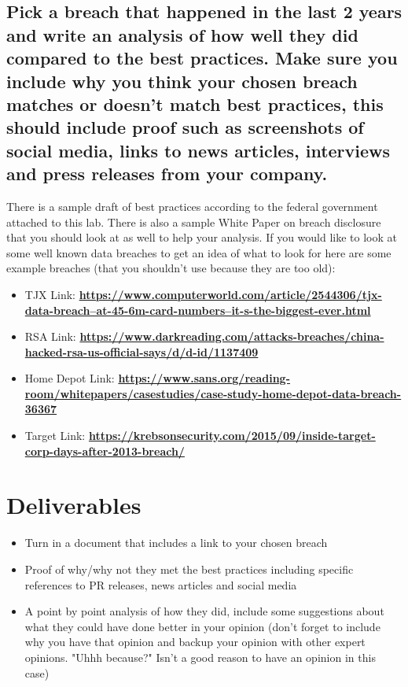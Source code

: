 \documentclass[12pt]{article}
\begin{document}
\subsection*{Pick a breach that happened in the last 2 years and write an analysis of how well they did compared to the best practices. Make sure you include why you think your chosen breach matches or doesn't match best practices, this should include proof such as screenshots of social media, links to news articles, interviews and press releases from your company.}
There is a sample draft of best practices according to the federal government attached to this lab.  There is also a sample White Paper on breach disclosure that you should look at as well to help your analysis.  If you would like to look at some well known data breaches to get an idea of what to look for here are some example breaches (that you shouldn't use because they are too old):
    \begin{itemize}
        \item TJX Link: \href{https://www.computerworld.com/article/2544306/tjx-data-breach--at-45-6m-card-numbers--it-s-the-biggest-ever.html}{\textbf{https://www.computerworld.com/article/2544306/tjx-data-breach--at-45-6m-card-numbers--it-s-the-biggest-ever.html}}
        \item RSA Link: \href{https://www.darkreading.com/attacks-breaches/china-hacked-rsa-us-official-says/d/d-id/1137409}{\textbf{https://www.darkreading.com/attacks-breaches/china-hacked-rsa-us-official-says/d/d-id/1137409}}
        \item Home Depot Link: \href{https://www.sans.org/reading-room/whitepapers/casestudies/case-study-home-depot-data-breach-36367}{\textbf{https://www.sans.org/reading-room/whitepapers/casestudies/case-study-home-depot-data-breach-36367}}
        \item Target Link: \href{https://krebsonsecurity.com/2015/09/inside-target-corp-days-after-2013-breach/}{\textbf{https://krebsonsecurity.com/2015/09/inside-target-corp-days-after-2013-breach/}}
    \end{itemize}



\section*{Deliverables}
\begin{itemize}
    \item Turn in a document that includes a link to your chosen breach
    \item Proof of why/why not they met the best practices including specific references to PR releases, news articles and social media
    \item  A point by point analysis of how they did, include some suggestions about what they could have done better in your opinion (don't forget to include why you have that opinion and backup your opinion with other expert opinions. "Uhhh because?"  Isn't a good reason to have an opinion in this case)
\end{itemize}
\end{document}
